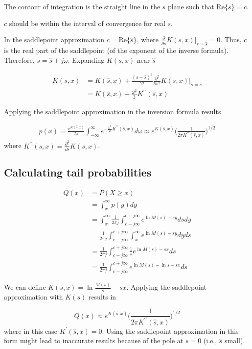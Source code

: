 The contour of integration is the straight line in the $s$ plane such that $\mathrm{Re}\{s\} = c$. 

$c$ should be within the interval of convergence for real $s$.

In the saddlepoint approximation $c = \mathrm{Re}\{\hat{s}\}$, where $\frac{\partial}{\partial s} K(s, x)|_{s=\hat{s}} = 0$. Thus, $c$ is the real part of the saddlepoint (of the exponent of the inverse formula). Therefore, $s = \hat{s} + j\omega$. Expanding $K(s,x)$ near $\hat{s}$

\begin{align} \nonumber
K(s, x) &= K(\hat{s}, x) + \frac{(s-\hat{s})^2}{2!}\frac{\partial^2}{\partial s^2}K(s,x)\bigg|_{s=\hat{s}} \\
&= K(\hat{s}, x)  -\frac{\omega^2}{2}K^{\prime\prime}(\hat{s},x)
\end{align}

Applying the saddlepoint approximation in the inversion formula results

\begin{align} \nonumber
p(x) = \frac{e^{K(\hat{s}, x)}}{2\pi }\int_{-\infty}^{\infty}e^{  -\frac{\omega^2}{2}K^{\prime\prime}(\hat{s},x)}d\omega
\approx e^{K(\hat{s},x)}\bigg(\frac{1}{2\pi K^{\prime\prime}(\hat{s},x)}\bigg)^{1/2}
\end{align}
where $K^{\prime\prime}(s,x) = \frac{\partial^2}{\partial s} K(s,x)$.

\subsection{Calculating tail probabilities}
\begin{align}
Q(x) &= P(X \geq x) \\
&= \int_x^{\infty} p(y)dy \\ \nonumber
&= \int_x^{\infty}\frac{1}{2\pi j}\int_{c-j\infty}^{c+j\infty}e^{\ln M(s) - sy}dsdy \\ \nonumber
&= \frac{1}{2\pi j}\int_{c-j\infty}^{c+j\infty}\int_x^{\infty}e^{\ln M(s) - sy}dyds \\ \nonumber
&= \frac{1}{2\pi j}\int_{c-j\infty}^{c+j\infty}\frac{1}{s}e^{\ln M(s) - sx}ds \\ 
&= \frac{1}{2\pi j}\int_{c-j\infty}^{c+j\infty}e^{\ln M(s) -\ln s- sx}ds 
\end{align}

We can define $K(s,x) = \ln\frac{M(s)}{s} - sx$. Applying the saddlepoint approximation with $K(s)$ results in

\begin{equation}
Q(x) \approx e^{K(\hat{s},x)}\bigg(\frac{1}{2\pi K^{\prime\prime}(\hat{s},x)}\bigg)^{1/2}
\end{equation}
where in this case $K^{\prime}(\hat{s},x) = 0$.
Using the saddlepoint approximation in this form might lead to inaccurate results because of the pole at $s = 0$ (i.e., $\hat{s}$ small).